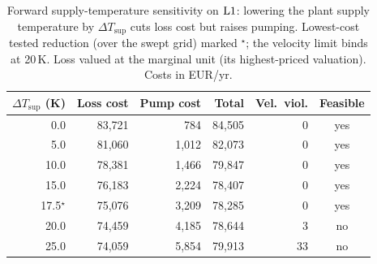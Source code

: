 \begin{table}[t]
\centering
\caption{Forward supply-temperature sensitivity on $\mathrm{L1}$: lowering the plant supply
temperature by $\Delta T_\text{sup}$ cuts loss cost but raises pumping. Lowest-cost tested
reduction (over the swept grid) marked $^{\star}$; the velocity limit binds at 20\,K. Loss valued at the
marginal unit (its highest-priced valuation). Costs in EUR/yr.}
\label{tab:tsup}
\begin{tabular}{rrrrrc}
\hline
$\Delta T_\text{sup}$ (K) & Loss cost & Pump cost & Total & Vel.\ viol. & Feasible \\
\hline
0.0 & 83,721 & 784 & 84,505 & 0 & yes \\
5.0 & 81,060 & 1,012 & 82,073 & 0 & yes \\
10.0 & 78,381 & 1,466 & 79,847 & 0 & yes \\
15.0 & 76,183 & 2,224 & 78,407 & 0 & yes \\
17.5$^{\star}$ & 75,076 & 3,209 & 78,285 & 0 & yes \\
20.0 & 74,459 & 4,185 & 78,644 & 3 & no \\
25.0 & 74,059 & 5,854 & 79,913 & 33 & no \\
\hline
\end{tabular}
\end{table}
